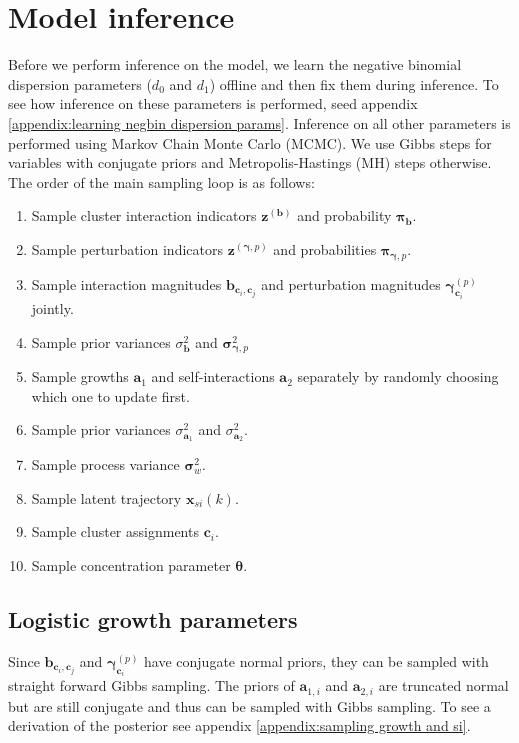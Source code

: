 \documentclass{article}
\newcommand{\ci}[1]{\mathbf{c}_{#1}}
\newcommand{\concc}{\mathbf{\theta}}
\newcommand{\growth}{\mathbf{a}_1}
\newcommand{\growthi}[1]{\mathbf{a}_{1,#1}}
\newcommand{\vargrowth}{\sigma^2_{\growth}}
\newcommand{\si}{\mathbf{a}_2}
\newcommand{\sii}[1]{\mathbf{a}_{2,#1}}
\newcommand{\varsi}{\sigma^2_{\si}}
\newcommand{\interact}{\mathbf{b}}
\newcommand{\interactcij}[2]{\interact_{\ci{#1}, \ci{#2}}}
\newcommand{\zinteract}{\mathbf{z}^{(\interact)}}
\newcommand{\varinteract}{\sigma^2_{\interact}}
\newcommand{\probinteract}{\mathbf{\pi}_{\interact}}
\newcommand{\pert}{\mathbf{\gamma}}
\newcommand{\pertic}[2]{\mathbf{\gamma}^{(#1)}_{\ci{#2}}} %
\newcommand{\zperti}[1]{\mathbf{z}^{(\pert, #1)}}
\newcommand{\varperti}[1]{\mathbf{\sigma}^2_{\pert, #1}}
\newcommand{\probperti}[1]{\mathbf{\pi}_{\pert, #1}}
\newcommand{\pv}{\mathbf{\sigma}_w^2}
\newcommand{\xsik}[3]{\mathbf{x}_{#1 #2}(#3)}
\newcommand{\countparamone}{d_0}
\newcommand{\countparamtwo}{d_1}
\begin{document}
\section{Model inference}
Before we perform inference on the model, we learn the negative binomial dispersion parameters ($\countparamone$ and $\countparamtwo$) offline and then fix them during inference. To see how inference on these parameters is performed, seed appendix \ref{appendix:learning negbin dispersion params}. Inference on all other parameters is performed using Markov Chain Monte Carlo (MCMC). We use Gibbs steps for variables with conjugate priors and Metropolis-Hastings (MH) steps otherwise. The order of the main sampling loop is as follows:
\begin{enumerate}
    \item Sample cluster interaction indicators $\zinteract$ and probability $\probinteract$.
    \item Sample perturbation indicators $\zperti{p}$ and probabilities $\probperti{p}$.
    \item Sample interaction magnitudes $\interactcij{i}{j}$ and perturbation magnitudes $\pertic{p}{i}$ jointly.
    \item Sample prior variances $\varinteract$ and $\varperti{p}$
    \item Sample growths $\growth$ and self-interactions $\si$ separately by randomly choosing which one to update first.
    \item Sample prior variances $\vargrowth$ and $\varsi$.
    \item Sample process variance $\pv$.
    \item Sample latent trajectory $\xsik{s}{i}{k}$.
    \item Sample cluster assignments $\ci{i}$.
    \item Sample concentration parameter $\concc$.
\end{enumerate}

\subsection{Logistic growth parameters}
Since $\interactcij{i}{j}$ and $\pertic{p}{i}$ have conjugate normal priors, they can be sampled with straight forward Gibbs sampling.
The priors of $\growthi{i}$ and $\sii{i}$ are truncated normal but are still conjugate and thus can be sampled with Gibbs sampling. To see a derivation of the posterior see appendix \ref{appendix:sampling growth and si}.
\end{document}
